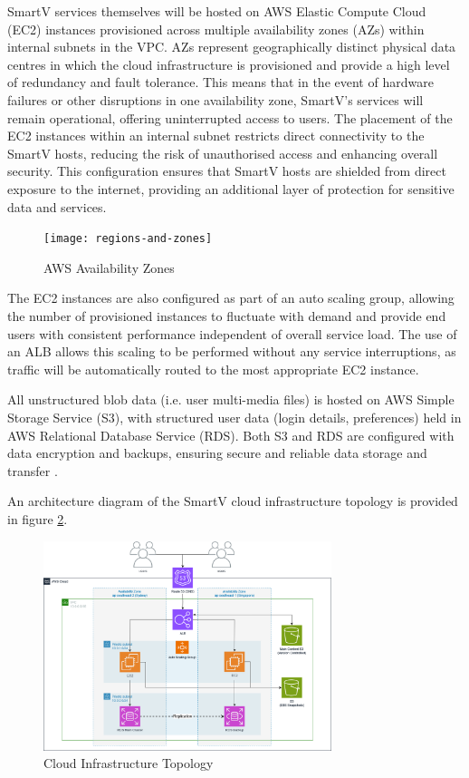SmartV services themselves will be hosted on AWS Elastic Compute Cloud (EC2) instances provisioned across multiple availability zones (AZs) within internal subnets in the VPC. AZs represent geographically distinct physical data centres in which the cloud infrastructure is provisioned and provide a high level of redundancy and fault tolerance. This means that in the event of hardware failures or other disruptions in one availability zone, SmartV's services will remain operational, offering uninterrupted access to users. The placement of the EC2 instances within an internal subnet restricts direct connectivity to the SmartV hosts, reducing the risk of unauthorised access and enhancing overall security. This configuration ensures that SmartV hosts are shielded from direct exposure to the internet, providing an additional layer of protection for sensitive data and services.

\begin{figure}[h]
    \centering
    \texttt{[image: regions-and-zones]}
    \caption{AWS Availability Zones \parencite{amazonwebservicesAWSRegionsAvailability}}
    \label{fig:availabilityzones}
\end{figure}

The EC2 instances are also configured as part of an auto scaling group, allowing the number of provisioned instances to fluctuate with demand and provide end users with consistent performance independent of overall service load. The use of an ALB allows this scaling to be performed without any service interruptions, as traffic will be automatically routed to the most appropriate EC2 instance.


All unstructured blob data (i.e. user multi-media files) is hosted on AWS Simple Storage Service (S3), with structured user data (login details, preferences) held in AWS Relational Database Service (RDS). Both S3 and RDS are configured with data encryption and backups, ensuring secure and reliable data storage and transfer \parencite{amazonwebservicesEncryptingAmazonRDS2023, amazonwebservicesProtectingDataEncryption}.

An architecture diagram of the SmartV cloud infrastructure topology is provided in figure \ref{fig:awsdiagram}.

\begin{figure}[h]
    \centering
    \includegraphics[width=0.75\textwidth]{cci_aws}
    \caption{Cloud Infrastructure Topology}
    \label{fig:awsdiagram}
\end{figure}


